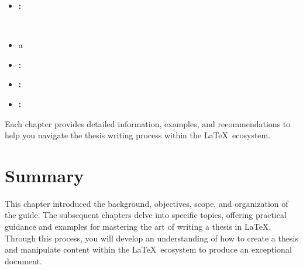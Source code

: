\begin{description}
\begin{itemize}
				\item \textbf{:}  
			\end{itemize}
			\item[\Cref{prt:imgsandfigs}: \nameref{prt:imgsandfigs}]~%
			\begin{itemize}
				\item a
				\item \textbf{:}  
				\item \textbf{:}  
				\item \textbf{:}  
			\end{itemize}
		\end{description}

		Each chapter provides detailed information, examples, and recommendations to help you navigate the thesis writing process within the \LaTeX\ ecosystem.

	\section{Summary}
		This chapter introduced the background, objectives, scope, and organization of the guide. 
		The subsequent chapters delve into specific topics, offering practical guidance and examples for mastering the art of writing a thesis in \LaTeX.
		Through this process, you will develop an understanding of how to create a thesis and manipulate content within the \LaTeX\ ecosystem to produce an exceptional document.
